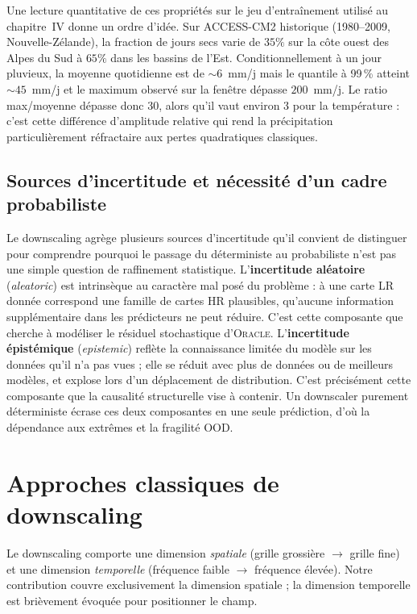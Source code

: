 \documentclass[14pt,a4paper,openany]{extreport}
\newcommand{\Oracle}{\textsc{Oracle}}
\begin{document}
Une lecture quantitative de ces propriétés sur le jeu d'entraînement utilisé au chapitre~IV donne un ordre d'idée. Sur ACCESS-CM2 historique (1980--2009, Nouvelle-Zélande), la fraction de jours secs varie de $35\%$ sur la côte ouest des Alpes du Sud à $65\%$ dans les bassins de l'Est. Conditionnellement à un jour pluvieux, la moyenne quotidienne est de $\sim$$6$~mm/j mais le quantile à 99\,\% atteint $\sim$$45$~mm/j et le maximum observé sur la fenêtre dépasse $200$~mm/j. Le ratio max/moyenne dépasse donc 30, alors qu'il vaut environ 3 pour la température : c'est cette différence d'amplitude relative qui rend la précipitation particulièrement réfractaire aux pertes quadratiques classiques.

\subsection{Sources d'incertitude et nécessité d'un cadre probabiliste}
\label{ssec:incertitudes}

Le downscaling agrège plusieurs sources d'incertitude qu'il convient de distinguer pour comprendre pourquoi le passage du déterministe au probabiliste n'est pas une simple question de raffinement statistique. L'\textbf{incertitude aléatoire} (\emph{aleatoric}) est intrinsèque au caractère mal posé du problème : à une carte LR donnée correspond une famille de cartes HR plausibles, qu'aucune information supplémentaire dans les prédicteurs ne peut réduire. C'est cette composante que cherche à modéliser le résiduel stochastique d'\Oracle{}. L'\textbf{incertitude épistémique} (\emph{epistemic}) reflète la connaissance limitée du modèle sur les données qu'il n'a pas vues ; elle se réduit avec plus de données ou de meilleurs modèles, et explose lors d'un déplacement de distribution. C'est précisément cette composante que la causalité structurelle vise à contenir. Un downscaler purement déterministe écrase ces deux composantes en une seule prédiction, d'où la dépendance aux extrêmes et la fragilité OOD.\label{fig:lognormal}

\section{Approches classiques de downscaling}
\label{sec:classiques}

Le downscaling comporte une dimension \emph{spatiale} (grille grossière $\to$ grille fine) et une dimension \emph{temporelle} (fréquence faible $\to$ fréquence élevée). Notre contribution couvre exclusivement la dimension spatiale ; la dimension temporelle est brièvement évoquée pour positionner le champ.
\end{document}
